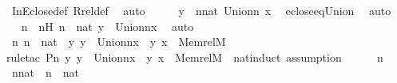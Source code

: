 \begin{isabellebody}
\ InEclose{\isacharunderscore}{\kern0pt}def\ Rrel{\isacharunderscore}{\kern0pt}def\ \isamarkupfalse%
\ auto\isanewline
\ \ \isamarkupfalse%
\ \isamarkupfalse%
\ {\isachardoublequoteopen}y\ {\isasymin}\ {\isacharparenleft}{\kern0pt}{\isasymUnion}n{\isasymin}nat{\isachardot}{\kern0pt}\ Union{\isacharcircum}{\kern0pt}n\ {\isacharparenleft}{\kern0pt}x{\isacharparenright}{\kern0pt}{\isacharparenright}{\kern0pt}{\isachardoublequoteclose}\ \isamarkupfalse%
\ eclose{\isacharunderscore}{\kern0pt}eq{\isacharunderscore}{\kern0pt}Union\ \isamarkupfalse%
\ auto\isanewline
\ \ \isamarkupfalse%
\ \isamarkupfalse%
\ n\ \ nH{\isacharcolon}{\kern0pt}\ {\isachardoublequoteopen}n\ {\isasymin}\ nat{\isachardoublequoteclose}\ {\isachardoublequoteopen}y\ {\isasymin}\ Union{\isacharcircum}{\kern0pt}n{\isacharparenleft}{\kern0pt}x{\isacharparenright}{\kern0pt}{\isachardoublequoteclose}\ \isamarkupfalse%
\ auto\isanewline
\isanewline
\ \ \isamarkupfalse%
\ {\isachardoublequoteopen}{\isasymAnd}n{\isachardot}{\kern0pt}\ n\ {\isasymin}\ nat\ {\isasymLongrightarrow}\ {\isasymforall}y{\isachardot}{\kern0pt}\ y\ {\isasymin}\ Union{\isacharcircum}{\kern0pt}n{\isacharparenleft}{\kern0pt}x{\isacharparenright}{\kern0pt}\ {\isasymlongrightarrow}\ {\isacharless}{\kern0pt}y{\isacharcomma}{\kern0pt}\ x{\isachargreater}{\kern0pt}\ {\isasymin}\ Memrel{\isacharparenleft}{\kern0pt}M{\isacharparenright}{\kern0pt}{\isacharcircum}{\kern0pt}{\isacharplus}{\kern0pt}{\isachardoublequoteclose}\ \isanewline
\ \ \isamarkupfalse%
{\isacharparenleft}{\kern0pt}rule{\isacharunderscore}{\kern0pt}tac\ P{\isacharequal}{\kern0pt}{\isachardoublequoteopen}{\isasymlambda}n{\isachardot}{\kern0pt}\ {\isasymforall}y{\isachardot}{\kern0pt}\ y\ {\isasymin}\ Union{\isacharcircum}{\kern0pt}n{\isacharparenleft}{\kern0pt}x{\isacharparenright}{\kern0pt}\ {\isasymlongrightarrow}\ {\isacharless}{\kern0pt}y{\isacharcomma}{\kern0pt}\ x{\isachargreater}{\kern0pt}\ {\isasymin}\ Memrel{\isacharparenleft}{\kern0pt}M{\isacharparenright}{\kern0pt}{\isacharcircum}{\kern0pt}{\isacharplus}{\kern0pt}{\isachardoublequoteclose}\ \ nat{\isacharunderscore}{\kern0pt}induct{\isacharcomma}{\kern0pt}\ assumption{\isacharparenright}{\kern0pt}\isanewline
\ \ \ \ \isamarkupfalse%
\ n\ \isamarkupfalse%
\ nnat\ {\isacharcolon}{\kern0pt}\ {\isachardoublequoteopen}n\ {\isasymin}\ nat{\isachardoublequoteclose}\ \isanewline
\ \ \ \ \isamarkupfalse%

\end{isabellebody}
